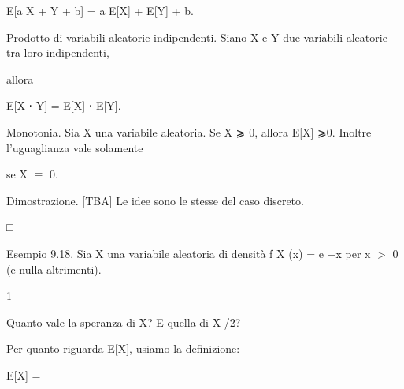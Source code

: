 \documentclass[a4paper,portrait,12pt]{article}
\begin{document}
\begin{flushleft}
E[a X + Y + b] = a E[X] + E[Y] + b.
\end{flushleft}


\begin{flushleft}
Prodotto di variabili aleatorie indipendenti. Siano X e Y due variabili aleatorie tra loro indipendenti,
\end{flushleft}


\begin{flushleft}
allora
\end{flushleft}


\begin{flushleft}
E[X ⋅ Y] = E[X] ⋅ E[Y].
\end{flushleft}


\begin{flushleft}
Monotonia. Sia X una variabile aleatoria. Se X ⩾ 0, allora E[X] ⩾0. Inoltre l'uguaglianza vale solamente
\end{flushleft}


\begin{flushleft}
se X $\equiv$ 0.
\end{flushleft}


\begin{flushleft}
Dimostrazione. [TBA] Le idee sono le stesse del caso discreto.
\end{flushleft}





□





\begin{flushleft}
Esempio 9.18. Sia X una variabile aleatoria di densit\`{a} f X (x) = e $-$x per x $>$ 0 (e nulla altrimenti).
\end{flushleft}


1


\begin{flushleft}
Quanto vale la speranza di X? E quella di X /2?
\end{flushleft}


\begin{flushleft}
Per quanto riguarda E[X], usiamo la definizione:
\end{flushleft}


\begin{flushleft}
E[X] =
\end{flushleft}
\end{document}
